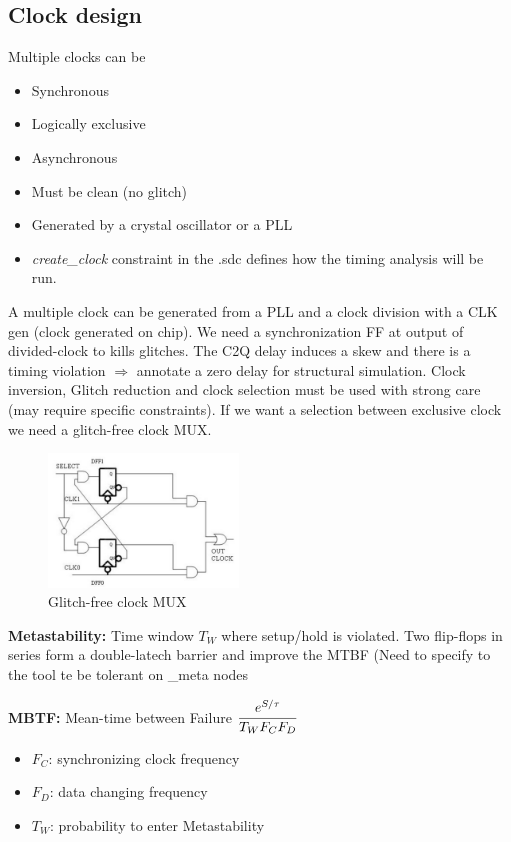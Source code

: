 \subsection{Clock design}
Multiple clocks can be
\begin{itemize}
  \item Synchronous
  \item Logically exclusive 
  \item Asynchronous
\end{itemize}
\bigbreak
\begin{itemize}
  \item Must be clean (no glitch)
  \item Generated by a crystal oscillator or a PLL
  \item \textit{create\_clock} constraint in the .sdc defines how the timing analysis will be run.
\end{itemize}
\bigbreak
A multiple clock can be generated from a PLL and a clock division with a CLK gen (clock generated on chip). We need a synchronization FF at output of divided-clock to kills glitches. The C2Q delay induces a skew and there is a timing violation \(\Rightarrow\) annotate a zero delay for structural simulation.
\bigbreak
Clock inversion, Glitch reduction and clock selection must be used with strong care (may require specific constraints).
\bigbreak
If we want a selection between exclusive clock we need a glitch-free clock MUX.

\begin{figure}[!ht]
  \centering
  \includegraphics[width=0.45\textwidth]{Images/glitch_free_mux.png}
  \caption{Glitch-free clock MUX}
  \label{glitch-free MUX}
\end{figure}


\textbf{Metastability:} Time window \(T_W\) where setup/hold is violated. Two flip-flops in series form a double-latech barrier and improve the MTBF (Need to specify to the tool te be tolerant on \_meta nodes

\textbf{MBTF:} Mean-time between Failure \( \cfrac{e^{S/\tau}}{T_WF_CF_D}\)
\begin{itemize}
  \item \(F_C\): synchronizing clock frequency
  \item \(F_D\): data changing frequency
\item \(T_W\): probability to enter Metastability
\end{itemize}


